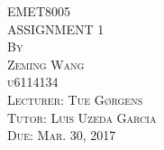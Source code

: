 \documentclass{article}
\begin{document}




\thispagestyle{empty}

\begin{center}
\huge
\vspace*{2.0in} EMET8005 
\\\vspace{0.5in} ASSIGNMENT 1
\normalsize
\\\vspace{0.5in} \textsc{By}
\\\vspace{0.1in} \textsc{Zeming Wang}
\\\vspace{0.1in} \textsc{u6114134}
\normalsize
\\\vspace{0.5in} \textsc{Lecturer: Tue Gørgens}
\\\vspace{0.1in} \textsc{Tutor: Luis Uzeda Garcia}
\normalsize
\\\vspace{0.5in} \textsc{Due: Mar. 30, 2017}
\end{center}

\newpage
\setcounter{page}{1}
\end{document}
